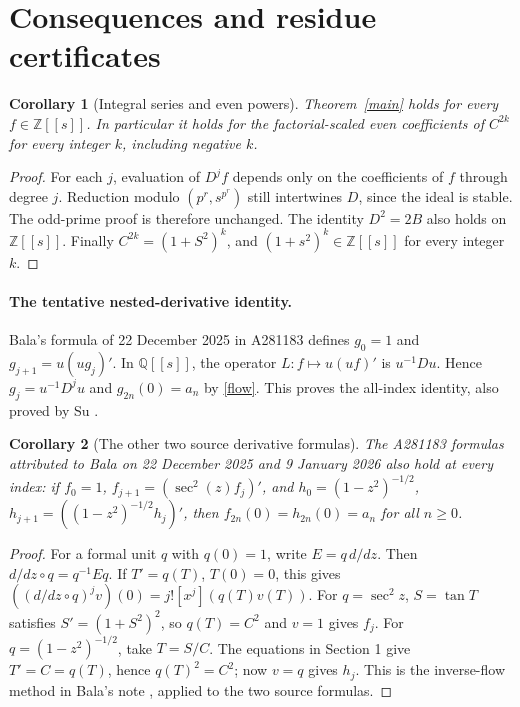 \documentclass[11pt]{article}
\newtheorem{corollary}{Corollary}
\begin{document}
\section{Consequences and residue certificates}
\begin{corollary}[Integral series and even powers]\label{series}
Theorem~\ref{main} holds for every $f\in\mathbb Z[[s]]$.
In particular it holds for the factorial-scaled even coefficients
of $C^{2k}$ for every integer $k$, including negative $k$.
\end{corollary}
\begin{proof}
For each $j$, evaluation of $D^jf$ depends only on the coefficients
of $f$ through degree $j$. Reduction modulo $(p^r,s^{p^r})$
still intertwines $D$, since the ideal is stable. The odd-prime
proof is therefore unchanged. The identity $D^2=2B$ also holds
on $\mathbb Z[[s]]$. Finally $C^{2k}=(1+S^2)^k$, and
$(1+s^2)^k\in\mathbb Z[[s]]$ for every integer $k$.
\end{proof}

\paragraph{The tentative nested-derivative identity.}
Bala's formula of 22 December 2025 in A281183 defines
$g_0=1$ and $g_{j+1}=u(ug_j)'$. In $\mathbb Q[[s]]$,
the operator $L:f\mapsto u(uf)'$ is $u^{-1}Du$.
Hence $g_j=u^{-1}D^ju$ and $g_{2n}(0)=a_n$ by \eqref{flow}.
This proves the all-index identity, also proved by Su
\cite[Proposition 3.5]{su}.

\begin{corollary}[The other two source derivative formulas]\label{nested}
The A281183 formulas attributed to Bala on 22 December 2025 and
9 January 2026 also hold at every index: if
$f_0=1$, $f_{j+1}=(\sec^2(z)f_j)'$, and
$h_0=(1-z^2)^{-1/2}$,
$h_{j+1}=((1-z^2)^{-1/2}h_j)'$, then
$f_{2n}(0)=h_{2n}(0)=a_n$ for all $n\ge0$.
\end{corollary}
\begin{proof}
For a formal unit $q$ with $q(0)=1$, write $E=q\,d/dz$.
Then $d/dz\circ q=q^{-1}Eq$. If $T'=q(T)$, $T(0)=0$,
this gives $((d/dz\circ q)^jv)(0)=j![x^j](q(T)v(T))$.
For $q=\sec^2z$, $S=\tan T$ satisfies $S'=(1+S^2)^2$,
so $q(T)=C^2$ and $v=1$ gives $f_j$.
For $q=(1-z^2)^{-1/2}$, take $T=S/C$.
The equations in Section 1 give $T'=C=q(T)$, hence $q(T)^2=C^2$;
now $v=q$ gives $h_j$. This is the inverse-flow method in
Bala's note \cite[Corollary 1]{bala}, applied to the two source formulas.
\end{proof}
\end{document}

